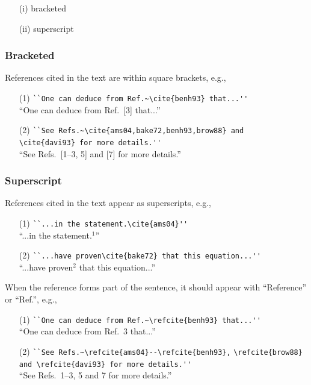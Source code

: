 \begin{enumerate}
\item[(i)] bracketed
\item[(ii)] superscript
\end{enumerate}

\subsubsection{Bracketed}
References cited in the text are within square brackets, e.g.,

\begin{enumerate}
\item[(1)] \verb|``One can deduce from Ref.~\cite{benh93} that...''|\\
            ``One can deduce from Ref.~[3] that...''
\smallskip
\item[(2)] \verb|``See Refs.~\cite{ams04,bake72,benh93,brow88} and|\\
      \verb|\cite{davi93} for more details.''|\\
      ``See Refs.~[1--3, 5] and [7] for more details.''
\end{enumerate}

\subsubsection{Superscript}

References cited in the text appear as superscripts, e.g.,

\begin{enumerate}
\item[(1)] \verb|``...in the statement.\cite{ams04}''|\\
            ``...in the statement.$^1$''
\smallskip
\item[(2)] \verb|``...have proven\cite{bake72} that this equation...''|\\
            ``...have proven$^2$ that this equation...''
\end{enumerate}

When the reference forms part of the sentence, it should appear with
``Reference'' or ``Ref.'', e.g.,

\begin{enumerate}
\item[(1)] \verb|``One can deduce from Ref.~\refcite{benh93} that...''|\\
      ``One can deduce from Ref.~3 that...''
\smallskip
\item[(2)] \verb|``See Refs.~\refcite{ams04}--\refcite{benh93},|
      \verb|\refcite{brow88} and \refcite{davi93} for more details.''|\\
     ``See Refs.~1--3, 5 and 7 for more details.''
\end{enumerate}

